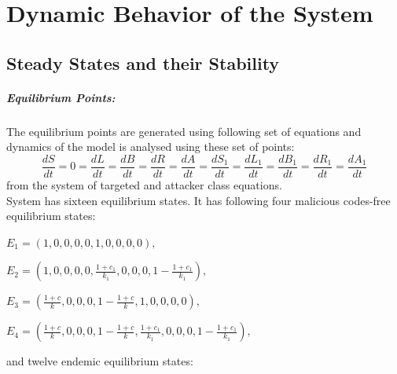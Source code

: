 \chapter{Dynamic Behavior of the System}
\section{Steady States and their Stability}
\paragraph* {Equilibrium Points:}
The equilibrium points are generated using following set of equations and dynamics of the model is analysed using these set of points:
 $$ \frac{dS}{dt} = 0 = \frac{dL}{dt} = \frac{dB}{dt} = \frac{dR}{dt} = \frac{dA}{dt}=\frac{d{S_1}}{dt}=\frac{d{L_1}}{dt}= \frac{d{B_1}}{dt}=\frac{d{R_1}}{dt}=\frac{d{A_1}}{dt} $$
 from the system of targeted and attacker class equations.\\
System has sixteen equilibrium states. It has following four malicious codes-free equilibrium states:

$E_{1} = ( 1 , 0 , 0 , 0 , 0 , 1 , 0 , 0 , 0 , 0 ) \label{eq:E1},$

$E_{2} =  ( 1 , 0 , 0 , 0 , 0 ,  \frac{1+c_{1}}{k_{1}}  , 0 , 0 , 0 , 1 - \frac{1+c_{1}}{k_{1}})\label{eq:E2},$

$E_{3} =  ( \frac{1+c}{k} , 0 , 0 , 0 , 1-\frac{1+c}{k} , 1 , 0 , 0 , 0  ,0 )\label{eq:E3},$

$E_{4} =  ( \frac{1+c}{k} , 0 , 0 , 0 , 1-\frac{1+c}{k} , \frac{1+c_{1}}{k_{1}}  , 0 , 0 , 0 , 1 - \frac{1+c_{1}}{k_{1}})\label{eq:E4},$




and twelve endemic equilibrium states:

